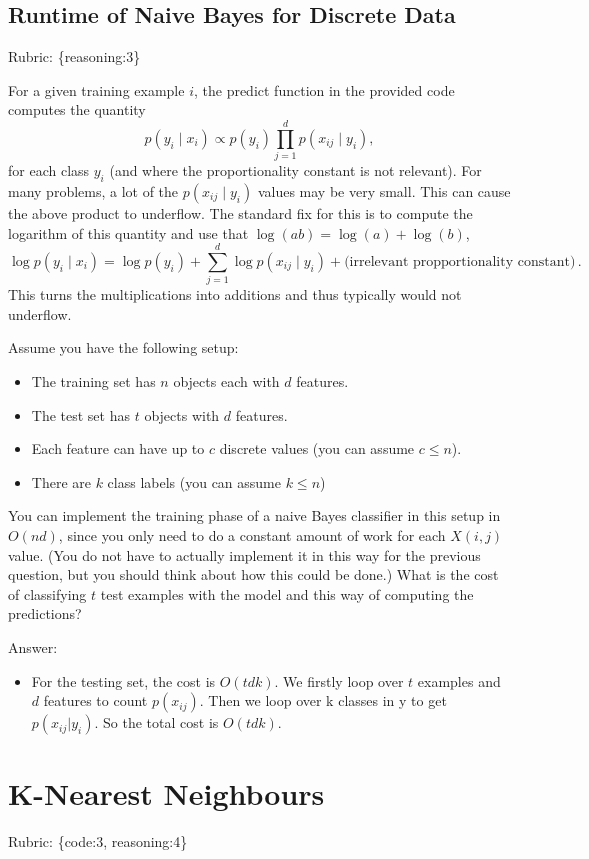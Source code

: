\documentclass{article}
\def\rubric#1{\gre{Rubric: \{#1\}}}{}
\def\blu#1{{\color{blu}#1}}
\def\gre#1{{\color{gre}#1}}
\def\cond{\; | \;}
\def\items#1{\begin{itemize}#1\end{itemize}}
\begin{document}
\subsection{Runtime of Naive Bayes for Discrete Data}
\rubric{reasoning:3}

For a given training example $i$, the predict function in the provided code computes the quantity
\[
p(y_i \cond x_i) \propto p(y_i)\prod_{j=1}^d p(x_{ij} \cond y_i),
\]
for each class $y_i$ (and where the proportionality constant is not relevant). For many problems, a lot of the $p(x_{ij} \cond y_i)$ values may be very small. This can cause the above product to underflow. The standard fix for this is to compute the logarithm of this quantity and use that $\log(ab) = \log(a)+\log(b)$,
\[
\log p(y_i \cond x_i) = \log p(y_i) + \sum_{j=1}^d \log p(x_{ij} \cond y_i) + \text{(irrelevant propportionality constant)} \, .
\]
This turns the multiplications into additions and thus typically would not underflow.

Assume you have the following setup:
\items{
\item The training set has $n$ objects each with $d$ features.
\item The test set has $t$ objects with $d$ features.
\item Each feature can have up to $c$ discrete values (you can assume $c \leq n$).
\item There are $k$ class labels (you can assume $k \leq n$)
}
You can implement the training phase of a naive Bayes classifier in this setup in $O(nd)$, since you only need to do a constant amount of work for each $X(i,j)$ value. (You do not have to actually implement it in this way for the previous question, but you should think about how this could be done.)
 \blu{What is the cost of classifying $t$ test examples with the model and this way of computing the predictions?}

 \gre{Answer:
\begin{itemize}
	\item For the testing set, the cost is $O(tdk)$. We firstly loop over $t$ examples and $d$ features to count $p(x_{ij})$. Then we loop over k classes in y to get $p(x_{ij}|y_{i})$. So the total cost is $O(tdk)$.
\end{itemize} }


\section{K-Nearest Neighbours}
\rubric{code:3, reasoning:4}
\end{document}
